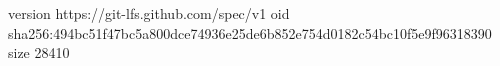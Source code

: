 version https://git-lfs.github.com/spec/v1
oid sha256:494bc51f47bc5a800dce74936e25de6b852e754d0182c54bc10f5e9f96318390
size 28410
